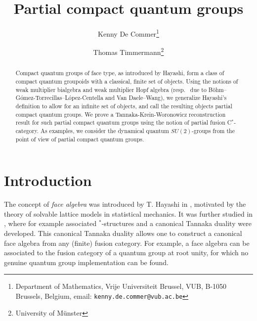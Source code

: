 \documentclass[10pt]{article}
\date{}
\theoremstyle{definition}
\numberwithin{equation}{section}
\begin{document}
\title{Partial compact quantum groups}

\author{Kenny De Commer\thanks{Department of Mathematics, Vrije Universiteit Brussel, VUB, B-1050 Brussels, Belgium, email: {\tt kenny.de.commer@vub.ac.be}}
\and Thomas Timmermann\thanks{University of M\"{u}nster}}

\maketitle

\begin{abstract}
\noindent Compact quantum groups of face type, as introduced by Hayashi, form a class of compact quantum groupoids with a classical, finite set of objects. Using the notions of weak multiplier bialgebra and weak multiplier Hopf algebra (resp.~ due to B{\"o}hm--G\'{o}mez-Torrecillas--L\'{o}pez-Centella and Van Daele--Wang), we generalize Hayashi's definition to allow for an infinite set of objects, and call the resulting objects partial compact quantum groups. We prove a Tannaka-Krein-Woronowicz reconstruction result for such partial compact quantum groups using the notion of partial fusion C$^*$-category. As examples, we consider the dynamical quantum $SU(2)$-groups from the point of view of partial compact quantum groups.
\end{abstract}







\tableofcontents

\section*{Introduction}

The concept of \emph{face algebra} was introduced by T. Hayashi in \cite{Hay2}, motivated by the theory of solvable lattice models in statistical mechanics. It was further studied in \cite{Hay1,Hay3,Hay4,Hay5,Hay6,Hay7,Hay8}, where for example associated $^*$-structures and a canonical Tannaka duality were developed. This canonical Tannaka duality allows one to construct a canonical face algebra from any (finite) fusion category. For example, a face algebra can be associated to the fusion category of a quantum group at root unity, for which no genuine quantum group implementation can be found. 
\end{document}
